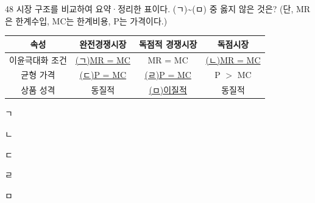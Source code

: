 \begin{question}{48}
시장 구조를 비교하여 요약·정리한 표이다. (ㄱ)\textasciitilde(ㅁ) 중 옳지 않은 것은? (단, MR은 한계수입, MC는 한계비용, P는 가격이다.)
\par{\small\centering\begin{tabular}{|c|c|c|c|}\hline
속성 & 완전경쟁시장 & 독점적 경쟁시장 & 독점시장 \\ \hline
이윤극대화 조건 & \uline{(ㄱ)MR = MC} & MR = MC & \uline{(ㄴ)MR = MC} \\ \hline
균형 가격 & \uline{(ㄷ)P = MC} & \uline{(ㄹ)P = MC} & P $>$ MC \\ \hline
상품 성격 & 동질적 & \uline{(ㅁ)이질적} & 동질적 \\ \hline
\end{tabular}\par}
\begin{choices}
  \item ㄱ
  \item ㄴ
  \item ㄷ
  \item ㄹ
  \item ㅁ
\end{choices}
\end{question}
